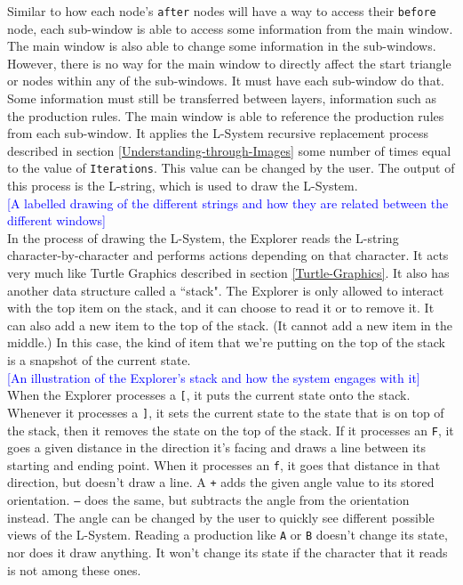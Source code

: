 \documentclass[12pt,twoside]{reedthesis}
\newcommand{\code}[1]{\texttt{#1}}
\begin{document}
	Similar to how each node's \code{after} nodes will have a way to access their \code{before} node, each sub-window is able to access some information from the main window. The main window is also able to change some information in the sub-windows. However, there is no way for the main window to directly affect the start triangle or nodes within any of the sub-windows. It must have each sub-window do that. Some information must still be transferred between layers, information such as the production rules. The main window is able to reference the production rules from each sub-window. It applies the L-System recursive replacement process described in section \ref{Understanding-through-Images} some number of times equal to the value of \code{Iterations}. This value can be changed by the user. The output of this process is the L-string, which is used to draw the L-System.\\
	
	\textcolor{blue}{[A labelled drawing of the different strings and how they are related between the different windows]}\\
	
	In the process of drawing the L-System, the Explorer reads the L-string character-by-character and performs actions depending on that character. It acts very much like Turtle Graphics described in section \ref{Turtle-Graphics}. It also has another data structure called a ``stack". The Explorer is only allowed to interact with the top item on the stack, and it can choose to read it or to remove it. It can also add a new item to the top of the stack. (It cannot add a new item in the middle.) In this case, the kind of item that we're putting on the top of the stack is a snapshot of the current state.\\
	
	\textcolor{blue}{[An illustration of the Explorer's stack and how the system engages with it]}\\
	
	When the Explorer processes a \code{[}, it puts the current state onto the stack. Whenever it processes a \code{]}, it sets the current state to the state that is on top of the stack, then it removes the state on the top of the stack. If it processes an \code{F}, it goes a given distance in the direction it's facing and draws a line between its starting and ending point. When it processes an \code{f}, it goes that distance in that direction, but doesn't draw a line. A \code{+} adds the given angle value to its stored orientation. \code{–} does the same, but subtracts the angle from the orientation instead. The angle can be changed by the user to quickly see different possible views of the L-System. Reading a production like \code{A} or \code{B} doesn't change its state, nor does it draw anything. It won't change its state if the character that it reads is not among these ones.
	
\end{document}
